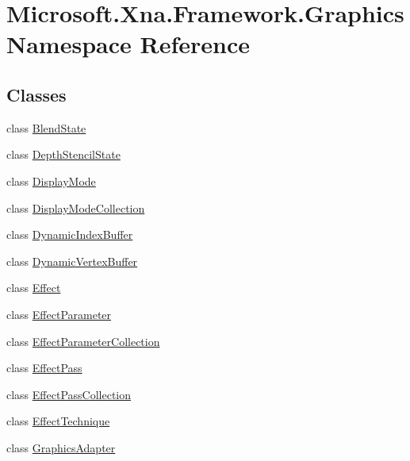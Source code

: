 \hypertarget{namespaceMicrosoft_1_1Xna_1_1Framework_1_1Graphics}{}\section{Microsoft.\+Xna.\+Framework.\+Graphics Namespace Reference}
\label{namespaceMicrosoft_1_1Xna_1_1Framework_1_1Graphics}
\subsection*{Classes}
\begin{DoxyCompactItemize}
\item 
class \hyperlink{classMicrosoft_1_1Xna_1_1Framework_1_1Graphics_1_1BlendState}{Blend\+State}
\item 
class \hyperlink{classMicrosoft_1_1Xna_1_1Framework_1_1Graphics_1_1DepthStencilState}{Depth\+Stencil\+State}
\item 
class \hyperlink{classMicrosoft_1_1Xna_1_1Framework_1_1Graphics_1_1DisplayMode}{Display\+Mode}
\item 
class \hyperlink{classMicrosoft_1_1Xna_1_1Framework_1_1Graphics_1_1DisplayModeCollection}{Display\+Mode\+Collection}
\item 
class \hyperlink{classMicrosoft_1_1Xna_1_1Framework_1_1Graphics_1_1DynamicIndexBuffer}{Dynamic\+Index\+Buffer}
\item 
class \hyperlink{classMicrosoft_1_1Xna_1_1Framework_1_1Graphics_1_1DynamicVertexBuffer}{Dynamic\+Vertex\+Buffer}
\item 
class \hyperlink{classMicrosoft_1_1Xna_1_1Framework_1_1Graphics_1_1Effect}{Effect}
\item 
class \hyperlink{classMicrosoft_1_1Xna_1_1Framework_1_1Graphics_1_1EffectParameter}{Effect\+Parameter}
\item 
class \hyperlink{classMicrosoft_1_1Xna_1_1Framework_1_1Graphics_1_1EffectParameterCollection}{Effect\+Parameter\+Collection}
\item 
class \hyperlink{classMicrosoft_1_1Xna_1_1Framework_1_1Graphics_1_1EffectPass}{Effect\+Pass}
\item 
class \hyperlink{classMicrosoft_1_1Xna_1_1Framework_1_1Graphics_1_1EffectPassCollection}{Effect\+Pass\+Collection}
\item 
class \hyperlink{classMicrosoft_1_1Xna_1_1Framework_1_1Graphics_1_1EffectTechnique}{Effect\+Technique}
\item 
class \hyperlink{classMicrosoft_1_1Xna_1_1Framework_1_1Graphics_1_1GraphicsAdapter}{Graphics\+Adapter}

\end{DoxyCompactItemize}
